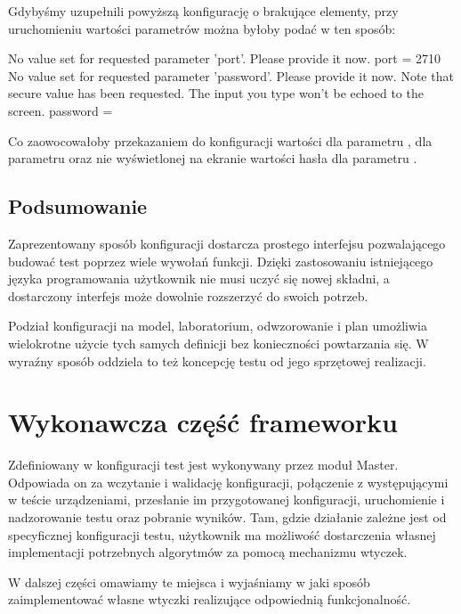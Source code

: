 \documentclass[00-praca-magisterska.tex]{subfiles}
\begin{document}
Gdybyśmy uzupełnili powyższą konfigurację o brakujące elementy, przy
uruchomieniu wartości parametrów można byłoby podać w ten sposób:

\begin{textcode}
  No value set for requested parameter 'port'. Please provide it now.
  port = 2710
  No value set for requested parameter 'password'. Please provide it now.
  Note that secure value has been requested. The input you type won't be echoed
  to the screen.
  password = 
\end{textcode}

Co zaowocowałoby przekazaniem do konfiguracji wartości  dla
parametru ,  dla parametru  oraz nie
wyświetlonej na ekranie wartości hasła dla parametru .

\label{arete-master-summary}
\subsection{Podsumowanie}

Zaprezentowany sposób konfiguracji dostarcza prostego interfejsu pozwalającego
budować test poprzez wiele wywołań funkcji. Dzięki zastosowaniu istniejącego
języka programowania użytkownik nie musi uczyć się nowej składni, a dostarczony
interfejs może dowolnie rozszerzyć do swoich potrzeb.

Podział konfiguracji na model, laboratorium, odwzorowanie i plan umożliwia
wielokrotne użycie tych samych definicji bez konieczności powtarzania się. W
wyraźny sposób oddziela to też koncepcję testu od jego sprzętowej realizacji.

\section{Wykonawcza część frameworku}

Zdefiniowany w konfiguracji test jest wykonywany przez moduł Master. Odpowiada
on za wczytanie i walidację konfiguracji, połączenie z występującymi w teście
urządzeniami, przesłanie im przygotowanej konfiguracji, uruchomienie i
nadzorowanie testu oraz pobranie wyników. Tam, gdzie działanie zależne
jest od specyficznej konfiguracji testu, użytkownik ma możliwość dostarczenia
własnej implementacji potrzebnych algorytmów za pomocą mechanizmu wtyczek.

W dalszej części omawiamy te miejsca i wyjaśniamy w jaki sposób zaimplementować
własne wtyczki realizujące odpowiednią funkcjonalność.
\end{document}
